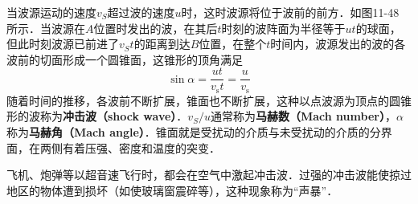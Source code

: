 
当波源运动的速度$v_S$超过波的速度$u $时，这时波源将位于波前的前方．如图11-48 所示．当波源在$A $位置时发出的波，在其后$t $时刻的波阵面为半径等于$ut $的球面，但此时刻波源已前进了$v_St$的距离到达$B $位置，在整个$t $时间内，波源发出的波的各波前的切面形成一个圆锥面，这锥形的顶角满足
\begin{equation}
\sin \alpha=\frac{u t}{v_{\mathrm{s}} t}=\frac{u}{v_{\mathrm{s}}}
\end{equation}
随着时间的推移，各波前不断扩展，锥面也不断扩展，这种以点波源为顶点的圆锥形的波称为\textbf{冲击波（shock wave）}．$v_S/u$通常称为\textbf{马赫数（Mach number）}，$\alpha$称为\textbf{马赫角（Mach angle）}．锥面就是受扰动的介质与未受扰动的介质的分界面，在两侧有着压强、密度和温度的突变．

飞机、炮弹等以超音速飞行时，都会在空气中激起冲击波．过强的冲击波能使掠过地区的物体遭到损坏（如使玻璃窗震碎等），这种现象称为“声暴”．